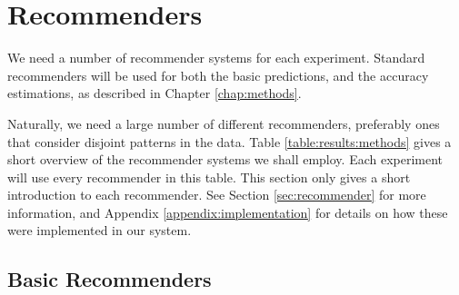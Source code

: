 \section{Recommenders}

We need a number of recommender systems for each experiment.
Standard recommenders will be used for both the basic predictions,
and the accuracy estimations,
as described in Chapter \ref{chap:methods}.

Naturally, we need a large number of different recommenders, preferably ones that consider
disjoint patterns in the data. Table \ref{table:results:methods}
gives a short overview of the recommender systems we shall employ.
Each experiment will use every recommender in this table.
This section only gives a short introduction to each recommender.
See Section \ref{sec:recommender} for more information, 
and Appendix \ref{appendix:implementation} for details on how these were implemented in our system.


\subsection{Basic Recommenders}

